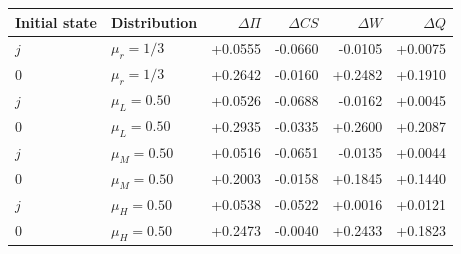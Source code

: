 \begin{tabular}{llrrrr}\toprule
Initial state & Distribution & $\Delta\Pi$ & $\Delta CS$ & $\Delta W$ & $\Delta Q$\\\midrule
$j$ & $\mu_r=1/3$ & +0.0555 & -0.0660 & -0.0105 & +0.0075 \\
$0$ & $\mu_r=1/3$ & +0.2642 & -0.0160 & +0.2482 & +0.1910 \\
$j$ & $\mu_L=0.50$ & +0.0526 & -0.0688 & -0.0162 & +0.0045 \\
$0$ & $\mu_L=0.50$ & +0.2935 & -0.0335 & +0.2600 & +0.2087 \\
$j$ & $\mu_M=0.50$ & +0.0516 & -0.0651 & -0.0135 & +0.0044 \\
$0$ & $\mu_M=0.50$ & +0.2003 & -0.0158 & +0.1845 & +0.1440 \\
$j$ & $\mu_H=0.50$ & +0.0538 & -0.0522 & +0.0016 & +0.0121 \\
$0$ & $\mu_H=0.50$ & +0.2473 & -0.0040 & +0.2433 & +0.1823 \\
\bottomrule\end{tabular}

